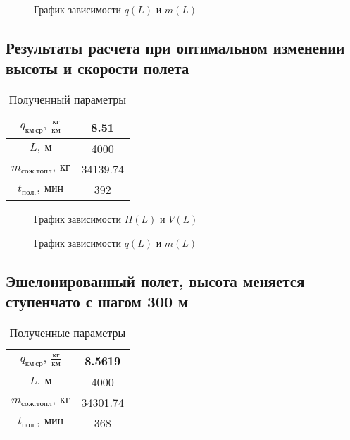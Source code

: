 \documentclass[bachelor,subf,14pt, substylefile = spbu.rtx]{disser}
\begin{document}
\begin{figure}[H]
\centering

\caption{График зависимости $q(L)$ и $m(L)$}
\label{fig:H_const_V_diff_L_m}
\end{figure}

\subsection{Результаты расчета при оптимальном изменении высоты и скорости полета}
\begin{table}[H]
    \centering
    \caption{Полученный параметры}
    \label{tab:H_opt_V_opt}
    \begin{tabular}{|c|c|}
        \hline
        $q_{км\, ср},\ \frac{кг}{км}$ & 8.51 \\
        \hline
        $L,\ м$ & 4000 \\
        \hline
        $m_{сож.топл},\ кг$ & 34139.74\\
        \hline
        $t_{пол.},\ мин$ & 392 \\
        \hline
    \end{tabular}
\end{table}

\begin{figure}[H]
\centering

\caption{График зависимости $H(L)$ и $V(L)$}
\label{fig:H_vat_optimal}
\end{figure}

\begin{figure}[H]
\centering

\caption{График зависимости $q(L)$ и $m(L)$}
\label{fig:H_opt_L_m}
\end{figure}

\subsection{Эшелонированный полет, высота меняется ступенчато с шагом 300 м}

\begin{table}[H]
    \centering
    \caption{Полученные параметры}
    \label{tab:H_300_V_opt}
    \begin{tabular}{|c|c|}
        \hline
        $q_{км\, ср},\ \frac{кг}{км}$ & 8.5619 \\
        \hline
        $L,\ м$ & 4000 \\
        \hline
        $m_{сож.топл},\ кг$ & 34301.74\\
        \hline
        $t_{пол.},\ мин$ & 368 \\
        \hline
    \end{tabular}
\end{table}
\end{document}
